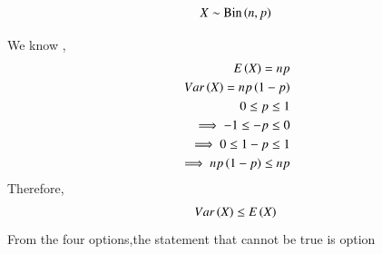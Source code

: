 \documentclass[journal,12pt,twocolumn]{IEEEtran}
\begin{document}
\solution
\begin{align}
X \sim \text{Bin}\left(n,p\right) \nonumber
\end{align}

We know ,
\begin{align} 
	E\left(X\right)=np\\
	Var\left(X\right)=np\left(1-p\right)\\
	0\leq p\leq1 \\
	\implies -1\leq -p \leq0\\
	\implies
	0 \leq 1-p \leq1\\
	\implies np\left(1-p\right)\leq np
\end{align}
Therefore,
\begin{align} 
	Var\left(X\right)\leq E\left(X\right)
\end{align}
From the four options,the statement that cannot be true is option \\
\end{document}
